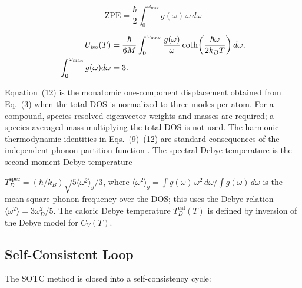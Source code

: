\documentclass[aps,prb,reprint,amsmath,amssymb,floatfix]{revtex4-2}
\begin{document}
\color{revisionblue}
\begin{equation}
\text{ZPE} = \frac{\hbar}{2}\int_0^{\omega_\text{max}} g(\omega)\,\omega\, d\omega
\end{equation}
\color{black}

\color{revisionblue}
\begin{equation}
\begin{aligned}
U_{\rm iso}(T)
 &= \frac{\hbar}{6M}\int_0^{\omega_{\rm max}}
 \frac{g(\omega)}{\omega}
 \coth\!\left(\frac{\hbar\omega}{2k_BT}\right)d\omega,\\
\int_0^{\omega_{\rm max}}g(\omega)d\omega&=3 .
\end{aligned}
\end{equation}
\color{black}

\color{revisionblue}
Equation~(12) is the monatomic one-component displacement obtained from
Eq.~(3) when the total DOS is normalized to three modes per atom. For a
compound, species-resolved eigenvector weights and masses are required; a
species-averaged mass multiplying the total DOS is not used. The harmonic
thermodynamic identities in Eqs.~(9)--(12) are standard consequences of the
independent-phonon partition function \cite{ref13}.
The spectral Debye temperature is the second-moment Debye temperature
\color{black}

\color{revisionblue}
\(T_D^\text{spec} = (\hbar/k_B)\sqrt{5\langle\omega^2\rangle_g/3}\),
where
\(\langle\omega^2\rangle_g = \int g(\omega)\,\omega^2\,d\omega/\int g(\omega)\,d\omega\)
is the mean-square phonon frequency over the DOS; this uses the Debye
relation \(\langle\omega^2\rangle = 3\omega_D^2/5\). The caloric Debye
temperature \(T_D^\text{cal}(T)\) is defined by inversion of the Debye
model for \(C_V(T)\).
\color{black}

\subsection{Self-Consistent Loop}\label{self-consistent-loop}

The SOTC method is closed into a self-consistency cycle:
\end{document}
